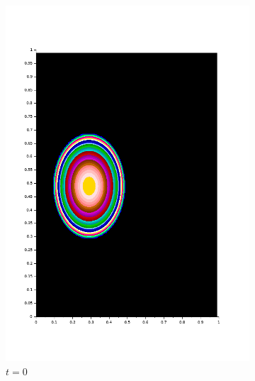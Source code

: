 \documentclass{article}
\begin{document}
\begin{figure}
	\begin{subfigure}[b]{0.5\textwidth}
		\includegraphics[width=\textwidth]{conv-2D_kappa_0,01_i.png}
		\caption{$t=0$}
	\end{subfigure}
	\begin{subfigure}[b]{0.5\textwidth}

\end{subfigure}
\end{figure}
\end{document}
